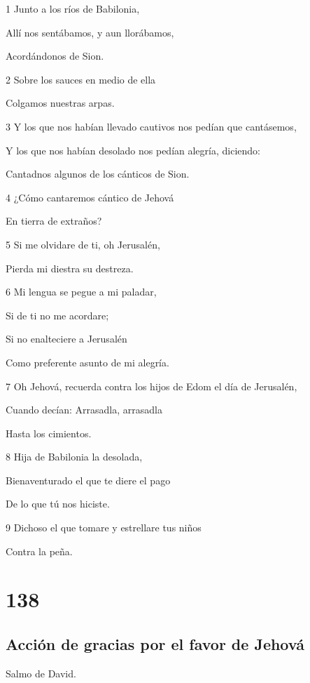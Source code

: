 \par 1 Junto a los ríos de Babilonia,
\par Allí nos sentábamos, y aun llorábamos,
\par Acordándonos de Sion.
\par 2 Sobre los sauces en medio de ella
\par Colgamos nuestras arpas.
\par 3 Y los que nos habían llevado cautivos nos pedían que cantásemos,
\par Y los que nos habían desolado nos pedían alegría, diciendo:
\par Cantadnos algunos de los cánticos de Sion.
\par 4 ¿Cómo cantaremos cántico de Jehová
\par En tierra de extraños?
\par 5 Si me olvidare de ti, oh Jerusalén,
\par Pierda mi diestra su destreza.
\par 6 Mi lengua se pegue a mi paladar,
\par Si de ti no me acordare;
\par Si no enalteciere a Jerusalén
\par Como preferente asunto de mi alegría.
\par 7 Oh Jehová, recuerda contra los hijos de Edom el día de Jerusalén,
\par Cuando decían: Arrasadla, arrasadla
\par Hasta los cimientos.
\par 8 Hija de Babilonia la desolada,
\par Bienaventurado el que te diere el pago
\par De lo que tú nos hiciste.
\par 9 Dichoso el que tomare y estrellare tus niños
\par Contra la peña.

\chapter{138}

\section*{Acción de gracias por el favor de Jehová}

\par Salmo de David.

